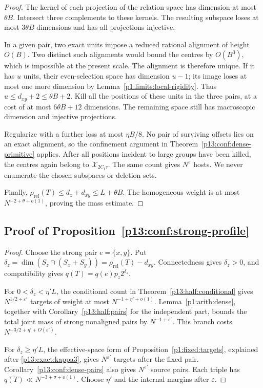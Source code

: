 \begin{proof}
The kernel of each projection of the relation space
has dimension at most \(\theta B\).
Intersect three complements to these kernels.
The resulting subspace loses at most \(3\theta B\)
dimensions and has all projections injective.

In a given pair, two exact units impose a reduced rational
alignment of height \(O(B)\). Two distinct such alignments
would bound the centres by \(O(B^3)\), which is impossible
at the present scale. The alignment is therefore unique.
If it has \(u\) units, their even-selection space has
dimension \(u-1\); its image loses at most one more
dimension by Lemma~\ref{p1:limits:local-rigidity}.
Thus \(u\le d_{xy}+2\le\theta B+2\).
Kill all the positions of these units in the three pairs,
at a cost of at most \(6\theta B+12\) dimensions.
The remaining space still has macroscopic dimension
and injective projections.

Regularize with a further loss at most \(\eta B/8\).
No pair of surviving offsets lies on an exact alignment,
so the confinement argument in
Theorem~\ref{p13:conf:dense-primitive} applies.
After all positions incident to large groups have been
killed, the centres again belong to
\(\mathcal X_{2C_t\tau}\).
The same count gives \(N^\varepsilon\) hosts.
We never enumerate the chosen subspaces or deletion sets.

Finally,
\(\rho_{\mathrm{rel}}(T)\le d_z+d_{xy}\le L+\theta B\).
The homogeneous weight is at most
\(N^{-2+\theta+o(1)}\), proving the mass estimate.
\end{proof}

\subsection{Proof of Proposition~\ref{p13:conf:strong-profile}}
\label{p14:comp:confinement:strong}

\begin{proof}
Choose the strong pair \(e=\{x,y\}\). Put
\(\delta_z=\dim(S_z\cap(S_x+S_y))
 =\rho_{\mathrm{rel}}(T)-d_{xy}\).
Connectedness gives \(\delta_z>0\), and compatibility gives
\(q(T)=q(e)p_z2^{\delta_z}\).

For \(0<\delta_z<\eta'L\), the conditional count
in Theorem~\ref{p13:half:conditional} gives
\(N^{1/2+\varepsilon'}\) targets of weight at most
\(N^{-1+\eta'+o(1)}\).
Lemma~\ref{p1:arith:dense}, together with
Corollary~\ref{p13:half:pairs} for the independent
part, bounds the total joint mass of strong nonaligned
pairs by \(N^{-1+\varepsilon'}\).
This branch costs \(N^{-3/2+\eta'+O(\varepsilon')}\).

For \(\delta_z\ge\eta'L\), the effective-space form of
Proposition~\ref{p1:fixed:targets}, explained after
\eqref{p13:exact:kappa3}, gives \(N^{\varepsilon'}\)
targets after the fixed pair.
Corollary~\ref{p13:conf:dense-pairs} also gives
\(N^{\varepsilon'}\) source pairs.
Each triple has \(q(T)\ll N^{-3+\sigma+o(1)}\).
Choose \(\eta'\) and the internal margins after
\(\varepsilon\).
\end{proof}
